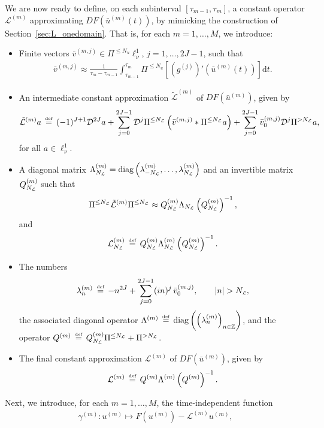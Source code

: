 \documentclass[10pt,a4paper]{article}
\theoremstyle{plain}
\newcommand{\ZZ}{\mathbb Z}
\renewcommand{\L}{\mathcal{L}}
\newcommand{\tL}{\tilde{\mathcal{L}}}
\newcommand{\D}{\mathcal{D}}
\newcommand{\bu}{\bar{u}}
\newcommand{\bv}{\bar{v}}
\newcommand{\1}{\mathbf{1}}
\renewcommand{\d}{\mathrm{d}}
\newcommand{\ds}{\displaystyle}
\newcommand{\bydef}{\,\stackrel{\mbox{\tiny\textnormal{\raisebox{0ex}[0ex][0ex]{def}}}}{=}\,}
\DeclareMathOperator{\diag}{diag}
\newcommand{\Nu}{N_{u}}
\newcommand{\NL}{N_{\text{\tiny{$\L$}}}}
\begin{document}
We are now ready to define, on each subinterval $[\tau_{m-1},\tau_m]$, a constant operator $\L^{(m)}$ approximating $DF(\bu^{(m)}(t))$, by mimicking the construction of Section~\ref{sec:L_onedomain}. That is, for each $m=1,\ldots,M$, we introduce:
\begin{itemize}
\item Finite vectors $\bv^{(m,j)} \in\Pi^{\leq \Nu}\ell^1_\nu$, $j=1,\ldots,2J-1$, such that
\begin{align*}
\bv^{(m,j)} \approx \frac{1}{\tau_m-\tau_{m-1}}\int_{\tau_{m-1}}^{\tau_m} \Pi^{\leq \Nu}\left[\left(g^{(j)}\right)'\left(\bu^{(m)}(t)\right)\right] \d t.
\end{align*}
\item An intermediate constant approximation $\tL^{(m)}$ of $DF(\bu^{(m)})$, given by
\begin{align*}
\tL^{(m)} a \bydef (-1)^{J+1} \D^{2J}a + \ds \sum_{j=0}^{2J-1} \D^{j}\Pi^{\leq \NL}\left( \bv^{(m,j)} \ast \Pi^{\leq \NL}a \right) + \sum_{j=0}^{2J-1} \bv^{(m,j)}_0 \D^{j} \Pi^{> \NL}a,
\end{align*}
for all $a\in\ell^1_\nu$.
\item A diagonal matrix $\Lambda_{\NL}^{(m)}= \text{diag}\left(\lambda_{-\NL}^{(m)},\ldots,\lambda_{\NL}^{(m)}\right)$ and an invertible matrix $Q_{\NL}^{(m)}$ such that
\begin{equation*}
\Pi^{\leq \NL} \tL^{(m)} \Pi^{\leq \NL} \approx Q_{\NL}^{(m)} \Lambda_{\NL} \left(Q_{\NL}^{(m)}\right)^{-1},
\end{equation*}
and
\begin{equation*}
\L_{\NL}^{(m)} \bydef Q_{\NL}^{(m)} \Lambda_{\NL}^{(m)} \left(Q_{\NL}^{(m)}\right)^{-1}.
\end{equation*}
\item The numbers 
\begin{align*}
\lambda_n^{(m)} \bydef -n^{2J} + \sum_{j=0}^{2J-1} (in)^j \,  \bv^{(m,j)}_0,\qquad \vert n\vert > \NL,
\end{align*}
the associated diagonal operator $\Lambda^{(m)}\bydef \diag\left(\left(\lambda^{(m)}_n\right)_{n\in\ZZ}\right)$, and the operator $Q^{(m)}\bydef Q_{\NL}^{(m)} \Pi^{\leq \NL} + \Pi^{> \NL}$.
\item The final constant approximation $\L^{(m)}$ of $DF(\bu^{(m)})$, given by
\begin{equation*}
\L^{(m)} \bydef Q^{(m)} \Lambda^{(m)} \left(Q^{(m)}\right)^{-1}.
\end{equation*}
\end{itemize}
%
Next, we introduce, for each $m=1,\ldots,M$, the time-independent function \begin{align*}
\gamma^{(m)}:u^{(m)} \mapsto F(u^{(m)}) - \L^{(m)}u^{(m)},
\end{align*}
\end{document}
